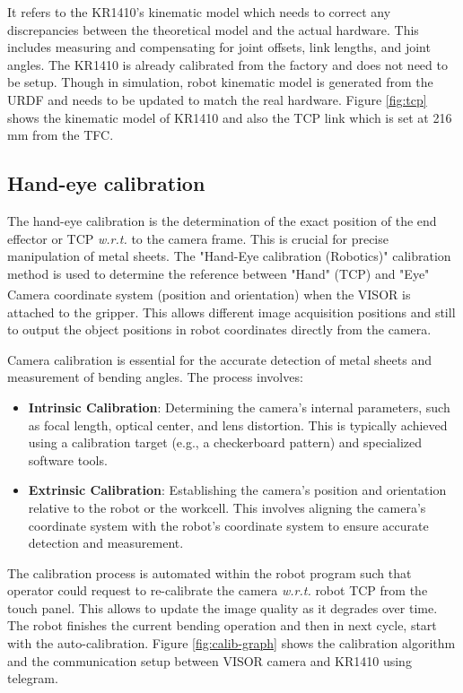 It refers to the KR1410's kinematic model which needs to correct any discrepancies between the theoretical model and the actual hardware. This includes measuring and compensating for joint offsets, link lengths, and joint angles. 
The KR1410 is already calibrated from the factory and does not need to be setup. Though in simulation, robot kinematic model is generated from the URDF and needs to be updated to match the real hardware. Figure \ref{fig:tcp} shows the kinematic model of KR1410 and also the TCP link which is set at 216 mm from the TFC.

\subsection{Hand-eye calibration}
\label{subsubsec:tcp-calibration}
The hand-eye calibration is the determination of the exact position of the end effector or TCP \textit{w.r.t.} to the camera frame. This is crucial for precise manipulation of metal sheets. The "Hand-Eye calibration (Robotics)" calibration method is used to determine the
reference between "Hand" (TCP) and "Eye" Camera coordinate system
(position and orientation) when the VISOR\textsuperscript{\textregistered} is attached to the gripper.
This allows different image acquisition positions and still to output the object positions
in robot coordinates directly from the camera.
\cite[page 102]{visor_user_manual}

Camera calibration is essential for the accurate detection of metal sheets and measurement of bending angles. The process involves:

\begin{itemize}
    \item \textbf{Intrinsic Calibration}: Determining the camera's internal parameters, such as focal length, optical center, and lens distortion. This is typically achieved using a calibration target (e.g., a checkerboard pattern) and specialized software tools.
    \item \textbf{Extrinsic Calibration}: Establishing the camera's position and orientation relative to the robot or the workcell. This involves aligning the camera's coordinate system with the robot's coordinate system to ensure accurate detection and measurement.
\end{itemize}

\vspace{1\baselineskip}
The calibration process is automated within the robot program
such that operator could request to re-calibrate the camera \textit{w.r.t.}
robot TCP from the touch panel. This allows to update the image quality as it degrades over time. 
The robot finishes the current
bending operation and then in next cycle, start with the auto-calibration. Figure \ref{fig:calib-graph} shows the calibration algorithm and the communication setup between VISOR camera and KR1410 using telegram.

